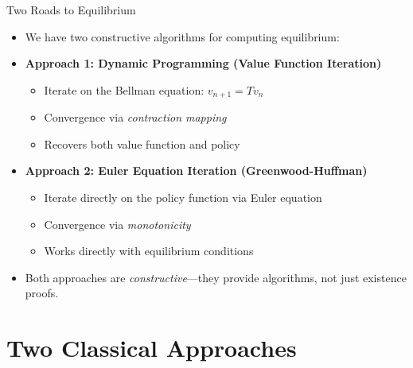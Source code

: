 \documentclass[10pt,english,aspectratio=169]{beamer}
\begin{document}
\begin{frame}{Two Roads to Equilibrium}
\begin{itemize}
\item We have two constructive algorithms for computing equilibrium:

\bigskip
\item \textbf{Approach 1: Dynamic Programming (Value Function Iteration)}
\begin{itemize}
    \item Iterate on the Bellman equation: $v_{n+1} = Tv_n$
    \item Convergence via \emph{contraction mapping}
    \item Recovers both value function and policy
\end{itemize}

\bigskip
\item \textbf{Approach 2: Euler Equation Iteration (Greenwood-Huffman)}
\begin{itemize}
    \item Iterate directly on the policy function via Euler equation
    \item Convergence via \emph{monotonicity}
    \item Works directly with equilibrium conditions
\end{itemize}

\bigskip
\item Both approaches are \emph{constructive}---they provide algorithms, not just existence proofs.
\end{itemize}
\end{frame}

\section{Two Classical Approaches}
\end{document}
